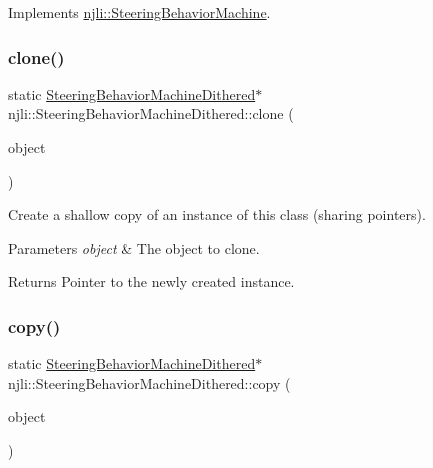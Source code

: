 Implements \mbox{\hyperlink{classnjli_1_1_steering_behavior_machine_aea431466acb4ef73220206bbcd515a9a}{njli\+::\+Steering\+Behavior\+Machine}}.

\mbox{\label{classnjli_1_1_steering_behavior_machine_dithered_ae37b36577ae4e6649fe03dc38ba8cda8}} 
\subsubsection{\texorpdfstring{clone()}{clone()}}
{\footnotesize\ttfamily static \mbox{\hyperlink{classnjli_1_1_steering_behavior_machine_dithered}{Steering\+Behavior\+Machine\+Dithered}}$\ast$ njli\+::\+Steering\+Behavior\+Machine\+Dithered\+::clone (\begin{DoxyParamCaption}\item[{const \mbox{\hyperlink{classnjli_1_1_steering_behavior_machine_dithered}{Steering\+Behavior\+Machine\+Dithered}} \&}]{object }\end{DoxyParamCaption})\hspace{0.3cm}{\ttfamily [static]}}

Create a shallow copy of an instance of this class (sharing pointers).


\begin{DoxyParams}{Parameters}
{\em object} & The object to clone.\\
\hline
\end{DoxyParams}
\begin{DoxyReturn}{Returns}
Pointer to the newly created instance. 
\end{DoxyReturn}
\mbox{\label{classnjli_1_1_steering_behavior_machine_dithered_a67fd94a3edce2e3f8b0aa18fc918333b}} 
\subsubsection{\texorpdfstring{copy()}{copy()}}
{\footnotesize\ttfamily static \mbox{\hyperlink{classnjli_1_1_steering_behavior_machine_dithered}{Steering\+Behavior\+Machine\+Dithered}}$\ast$ njli\+::\+Steering\+Behavior\+Machine\+Dithered\+::copy (\begin{DoxyParamCaption}\item[{const \mbox{\hyperlink{classnjli_1_1_steering_behavior_machine_dithered}{Steering\+Behavior\+Machine\+Dithered}} \&}]{object }\end{DoxyParamCaption})\hspace{0.3cm}{\ttfamily [static]}}

